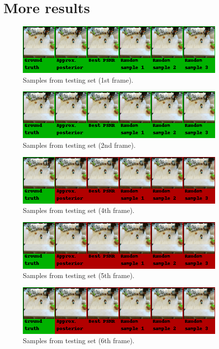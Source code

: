 \chapter{More results}\label{more-results}
    \begin{figure}[H]
        \centering
        \includegraphics[scale=0.9]{img/test_pred-0.png}
        \caption{Samples from testing set (1st frame).}
    \end{figure}
    \begin{figure}[H]
        \centering
        \includegraphics[scale=0.9]{img/test_pred-1.png}
        \caption{Samples from testing set (2nd frame).}
    \end{figure}
    \begin{figure}[H]
        \centering
        \includegraphics[scale=0.9]{img/test_pred-3.png}
        \caption{Samples from testing set (4th frame).}
    \end{figure}
    \begin{figure}[H]
        \centering
        \includegraphics[scale=0.9]{img/test_pred-4.png}
        \caption{Samples from testing set (5th frame).}
    \end{figure}
    \begin{figure}[H]
        \centering
        \includegraphics[scale=0.9]{img/test_pred-5.png}
        \caption{Samples from testing set (6th frame).}
    \end{figure}
